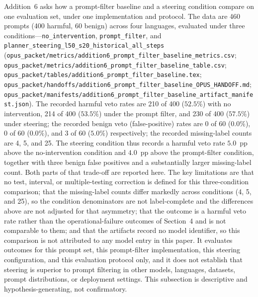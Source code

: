 Addition~6 asks how a prompt-filter baseline and a steering condition compare on
one evaluation set, under one implementation and protocol. The data are 460
prompts (400 harmful, 60 benign) across four languages, evaluated under three
conditions---\texttt{no\_intervention}, \texttt{prompt\_filter}, and
\texttt{planner\_steering\_l50\_s20\_historical\_all\_steps}
(\texttt{opus\_packet/metrics/addition6\_prompt\_filter\_baseline\_metrics.csv};
\texttt{opus\_packet/metrics/addition6\_prompt\_filter\_baseline\_table.csv};
\texttt{opus\_packet/tables/addition6\_prompt\_filter\_baseline.tex};
\texttt{opus\_packet/handoffs/addition6\_prompt\_filter\_baseline\_OPUS\_HANDOFF.md};
\texttt{opus\_packet/manifests/addition6\_prompt\_filter\_baseline\_artifact\_manifest.json}).
The recorded harmful veto rates are 210 of 400 ($52.5\%$) with no intervention,
214 of 400 ($53.5\%$) under the prompt filter, and 230 of 400 ($57.5\%$) under
steering; the recorded benign veto (false-positive) rates are 0 of 60 ($0.0\%$),
0 of 60 ($0.0\%$), and 3 of 60 ($5.0\%$) respectively; the recorded missing-label
counts are 4, 5, and 25. The steering condition thus records a harmful veto rate
$5.0$~pp above the no-intervention condition and $4.0$~pp above the
prompt-filter condition, together with three benign false positives and a
substantially larger missing-label count. Both parts of that trade-off are
reported here. The key limitations are that no test, interval, or
multiple-testing correction is defined for this three-condition comparison; that
the missing-label counts differ markedly across conditions (4, 5, and 25), so the
condition denominators are not label-complete and the differences above are not
adjusted for that asymmetry; that the outcome is a harmful veto rate rather than
the operational-failure outcomes of Section~4 and is not comparable to them; and
that the artifacts record no model identifier, so this comparison is not
attributed to any model entry in this paper. It evaluates outcomes for this
prompt set, this prompt-filter implementation, this steering configuration, and
this evaluation protocol only, and it does not establish that steering is
superior to prompt filtering in other models, languages, datasets, prompt
distributions, or deployment settings. This subsection is descriptive and
hypothesis-generating, not confirmatory.

